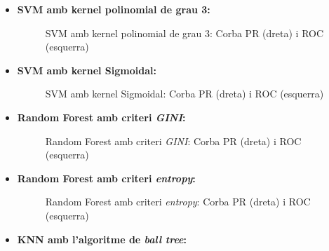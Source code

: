 \documentclass[a4paper, 11pt]{article}
\begin{document}
\begin{itemize}
            \item \textbf{SVM amb kernel polinomial de grau 3:}


                \begin{figure}[H]%
                \centering
                \qquad
                \caption*{SVM amb kernel polinomial de grau 3: Corba PR (dreta) i ROC (esquerra)}
                \end{figure}

            \newpage
            \item \textbf{SVM amb kernel Sigmoidal:}


                \begin{figure}[H]%
                \centering
                \qquad
                \caption*{SVM amb kernel Sigmoidal: Corba PR (dreta) i ROC (esquerra)}
                \end{figure}

            \item \textbf{Random Forest amb criteri \textit{GINI}:}


                \begin{figure}[H]%
                \centering
                \qquad
                \caption*{Random Forest amb criteri \textit{GINI}: Corba PR (dreta) i ROC (esquerra)}
                \end{figure}

            \item \textbf{Random Forest amb criteri \textit{entropy}:}


                \begin{figure}[H]%
                \centering
                \qquad
                \caption*{Random Forest amb criteri \textit{entropy}: Corba PR (dreta) i ROC (esquerra)}
                \end{figure}
            \newpage
            \item \textbf{KNN amb l'algoritme de \textit{ball tree}:}



\end{itemize}
\end{document}
